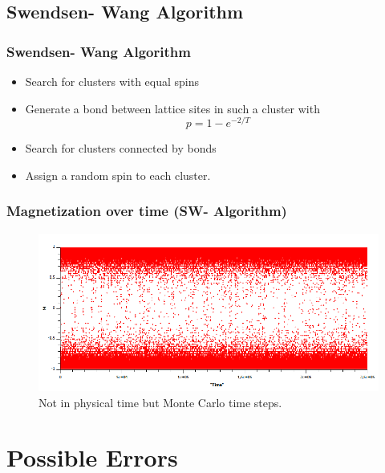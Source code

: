 \documentclass{beamer}
\begin{document}
\subsection{Swendsen- Wang Algorithm}
\begin{frame}\frametitle{Swendsen- Wang Algorithm}
\begin{itemize}
\item Search for clusters with equal spins
\item Generate a bond between lattice sites in such a cluster with \[p =1-e^{-2/T}\]
\item Search for clusters connected by bonds
\item Assign a random spin to each cluster.
\end{itemize}
\end{frame}

\begin{frame}
\frametitle{Magnetization over time (SW- Algorithm)}
\begin{figure}[h]\begin{center}\includegraphics[width = \textwidth]{./img/MSW.png}\end{center}\caption{Not in physical time but Monte Carlo time steps.}\end{figure}
\end{frame}


\section{Possible Errors}
\end{document}

